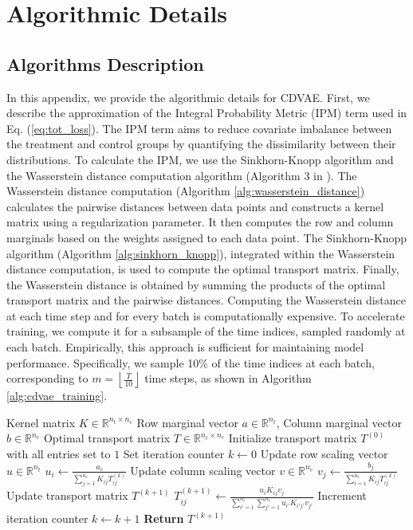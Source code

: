 \documentclass[10pt]{article} %
\begin{document}
\section{Algorithmic Details} 
\label{appendix:Algorithmic_details}
\subsection{Algorithms Description}
\label{appendix:algos_desc}
In this appendix, we provide the algorithmic details for CDVAE. First, we describe the approximation of the Integral Probability Metric (IPM) term used in Eq. (\ref{eq:tot_loss}). The IPM term aims to reduce covariate imbalance between the treatment and control groups by quantifying the dissimilarity between their distributions.  To calculate the IPM, we use the Sinkhorn-Knopp algorithm \citep{sinkhorn1967diagonal} and the Wasserstein distance computation algorithm (Algorithm 3 in \cite{cuturi2014fastWass}). The Wasserstein distance computation (Algorithm \ref{alg:wasserstein_distance}) calculates the pairwise distances between data points and constructs a kernel matrix using a regularization parameter. It then computes the row and column marginals based on the weights assigned to each data point. The Sinkhorn-Knopp algorithm (Algorithm \ref{alg:sinkhorn_knopp}), integrated within the Wasserstein distance computation, is used to compute the optimal transport matrix. Finally, the Wasserstein distance is obtained by summing the products of the optimal transport matrix and the pairwise distances.  Computing the Wasserstein distance at each time step and for every batch is computationally expensive. To accelerate training, we compute it for a subsample of the time indices, sampled randomly at each batch. Empirically, this approach is sufficient for maintaining model performance. Specifically, we sample 10\% of the time indices at each batch, corresponding to \(m = \left\lfloor\frac{T}{10}\right\rfloor\) time steps, as shown in Algorithm \ref{alg:cdvae_training}.
\begin{algorithm}
\caption{Sinkhorn-Knopp Algorithm}
\label{alg:sinkhorn_knopp}
\begin{algorithmic}[1]
  \Require Kernel matrix $K \in \mathbb{R}^{n_t \times n_c}$
  \Require Row marginal vector $a \in \mathbb{R}^{n_t}$, Column marginal vector $b \in \mathbb{R}^{n_c}$
  \Ensure Optimal transport matrix $T \in \mathbb{R}^{n_t \times n_c}$
  \State Initialize transport matrix $T^{(0)}$ with all entries set to $1$
  \State Set iteration counter $k \gets 0$
    \State Update row scaling vector $u \in \mathbb{R}^{n_t}$
    \State $u_i \gets \frac{a_i}{\sum_{j=1}^{n_c} K_{ij} T^{(k)}_{ij}}$
    \State Update column scaling vector $v \in \mathbb{R}^{n_c}$
    \State $v_j \gets \frac{b_j}{\sum_{i=1}^{n_t} K_{ij} T^{(k)}_{ij}}$
    \State Update transport matrix $T^{(k+1)}$
    \State $T^{(k+1)}_{ij} \gets \frac{u_i K_{ij} v_j}{\sum_{i'=1}^{n_t} \sum_{j'=1}^{n_c} u_{i'} K_{i'j'} v_{j'}}$
    \State Increment iteration counter $k \gets k + 1$
      \State \textbf{Return} $T^{(k+1)}$
    \EndIf
  \EndWhile
\end{algorithmic}
\end{algorithm}
\end{document}
